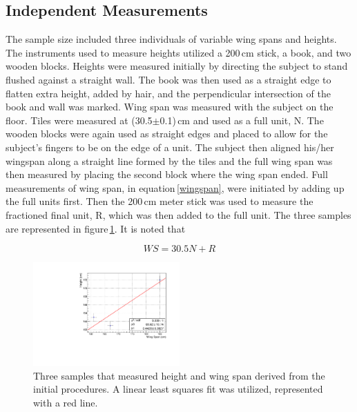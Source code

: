 \documentclass[twocolumn]{aastex6}
\begin{document}
\subsection{Independent Measurements}
The sample size included three individuals of variable wing spans and heights. The instruments used to measure heights utilized a 200\,cm stick, a book, and two wooden blocks. Heights were measured initially by directing the subject to stand flushed against a straight wall. The book was then used as a straight edge to flatten extra height, added by hair, and the perpendicular intersection of the book and wall was marked. Wing span was measured with the subject on the floor. Tiles were measured at (30.5$\pm$0.1)\,cm and used as a full unit, N. The wooden blocks were again used as straight edges and placed to allow for the subject's fingers to be on the edge of a unit. The subject then aligned his/her wingspan along a straight line formed by the tiles and the full wing span was then measured by placing the second block where the wing span ended. Full measurements of wing span, in equation\,\ref{wingspan}, were initiated by adding up the full units first. Then the 200\,cm meter stick was used to measure the fractioned final unit, R, which was then added to the full unit. The three samples are represented in figure\,\ref{bryan}. It is noted that 

\begin{equation}
WS = 30.5N + R
\label{wingspan}
\end{equation}

\begin{figure}[h]
  \centering
    \includegraphics[width=0.5\textwidth]{bry.pdf}
      \caption{Three samples that measured height and wing span derived from the initial procedures. A linear least squares fit was utilized, represented with a red line.}
      \label{bryan}
\end{figure}
\end{document}
